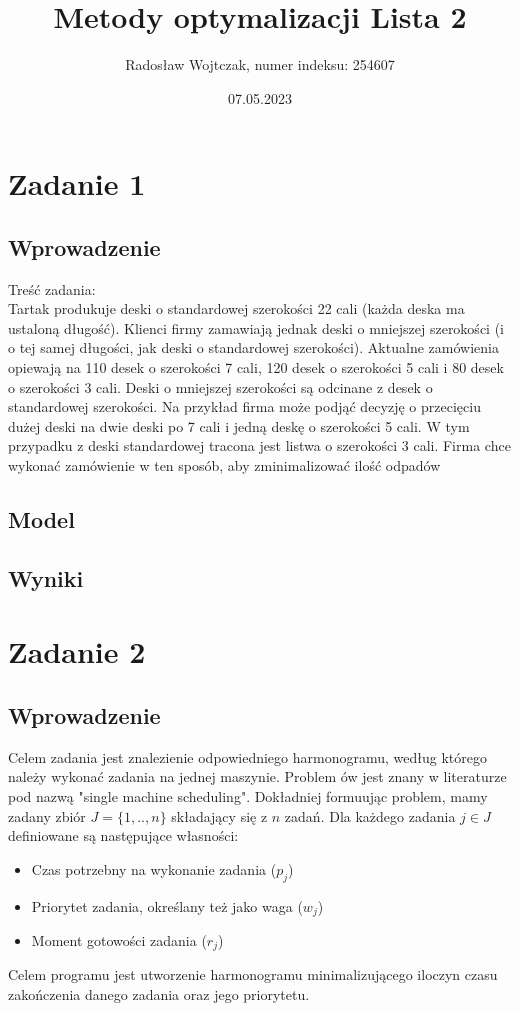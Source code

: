 \documentclass[a4paper,14pt]{report}
\title{Metody optymalizacji Lista 2}
\author{Radosław Wojtczak, numer indeksu: 254607}
\date{07.05.2023}
\begin{document}
\maketitle
\tableofcontents
\chapter{Zadanie 1}
\section{Wprowadzenie}
    Treść zadania: \\
    Tartak produkuje deski o standardowej szerokości 22 cali (każda deska ma ustaloną długość). Klienci firmy zamawiają jednak deski o mniejszej szerokości (i o tej samej długości,
jak deski o standardowej szerokości). Aktualne zamówienia opiewają na 110 desek o szerokości 7 cali, 120 desek o szerokości 5 cali i 80 desek o szerokości 3 cali. Deski o mniejszej
szerokości są odcinane z desek o standardowej szerokości. Na przykład firma może podjąć
decyzję o przecięciu dużej deski na dwie deski po 7 cali i jedną deskę o szerokości 5 cali.
W tym przypadku z deski standardowej tracona jest listwa o szerokości 3 cali. Firma chce
wykonać zamówienie w ten sposób, aby zminimalizować ilość odpadów
\section{Model}
    
\section{Wyniki} 

\chapter{Zadanie 2}
\section{Wprowadzenie}
    Celem zadania jest znalezienie odpowiedniego harmonogramu, według którego należy 
    wykonać zadania na jednej maszynie. Problem ów jest znany w literaturze pod nazwą 
    "single machine scheduling". Dokładniej formuując problem, mamy zadany zbiór
    $J = \{1,..,n\}$ składający się z $n$ zadań. Dla każdego zadania $j \in J $ definiowane są następujące własności:
    \begin{itemize}
        \item Czas potrzebny na wykonanie zadania ($p_{j}$)
        \item Priorytet zadania, określany też jako waga ($w_{j}$)
        \item Moment gotowości zadania ($r_{j}$)
    \end{itemize}
    Celem programu jest utworzenie harmonogramu minimalizującego iloczyn czasu zakończenia 
    danego zadania oraz jego priorytetu.
\end{document}

